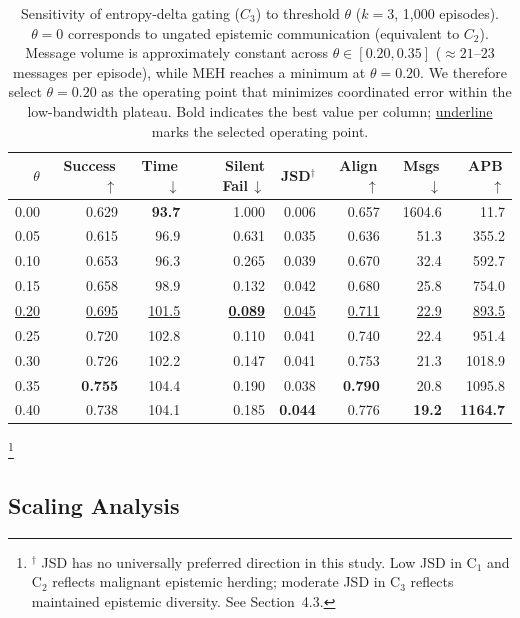 \documentclass[pdflatex,sn-mathphys-num]{sn-jnl}%
\theoremstyle{thmstyleone}%
\theoremstyle{thmstyletwo}%
\theoremstyle{thmstylethree}%
\begin{document}
\begin{table}[t]
\centering
\caption{Sensitivity of entropy-delta gating ($C_3$) to threshold $\theta$
         ($k=3$, 1{,}000 episodes). $\theta = 0$ corresponds to ungated
         epistemic communication (equivalent to $C_2$). Message volume
         is approximately constant across $\theta \in [0.20, 0.35]$
         ($\approx 21$--$23$ messages per episode), while MEH
         reaches a minimum at $\theta = 0.20$. We therefore select
         $\theta = 0.20$ as the operating point that minimizes coordinated
         error within the low-bandwidth plateau. Bold indicates the best
         value per column; \underline{underline} marks the selected
         operating point.}
\label{tab:delta_sensitivity}
\begin{tabular}{rrrrrrrr}
\toprule
$\theta$ & Success\,$\uparrow$ & Time\,$\downarrow$ & Silent Fail\,$\downarrow$ & JSD$^\dagger$ & Align\,$\uparrow$ & Msgs\,$\downarrow$ & APB\,$\uparrow$ \\
\midrule
0.00 & 0.629 & \textbf{93.7} & 1.000 & 0.006 & 0.657 & 1604.6 &  11.7 \\
0.05 & 0.615 & 96.9 & 0.631 & 0.035 & 0.636 &   51.3 & 355.2 \\
0.10 & 0.653 & 96.3 & 0.265 & 0.039 & 0.670 &   32.4 & 592.7 \\
0.15 & 0.658 & 98.9 & 0.132 & 0.042 & 0.680 &   25.8 & 754.0 \\
\underline{0.20} & \underline{0.695} & \underline{101.5} & \underline{\textbf{0.089}} & \underline{0.045} & \underline{0.711} & \underline{22.9} & \underline{893.5} \\
0.25 & 0.720 & 102.8 & 0.110 & 0.041 & 0.740 &   22.4 & 951.4 \\
0.30 & 0.726 & 102.2 & 0.147 & 0.041 & 0.753 &   21.3 & 1018.9 \\
0.35 & \textbf{0.755} & 104.4 & 0.190 & 0.038 & \textbf{0.790} &   20.8 & 1095.8 \\
0.40 & 0.738 & 104.1 & 0.185 & \textbf{0.044} & 0.776 & \textbf{19.2} & \textbf{1164.7} \\
\bottomrule
\end{tabular}
\end{table}
\footnote{$^\dagger$ JSD has no universally preferred direction in this study. 
Low JSD in C$_1$ and C$_2$ reflects malignant epistemic herding; 
moderate JSD in C$_3$ reflects maintained epistemic diversity. 
See Section~4.3.}

\subsection{Scaling Analysis}
\end{document}
